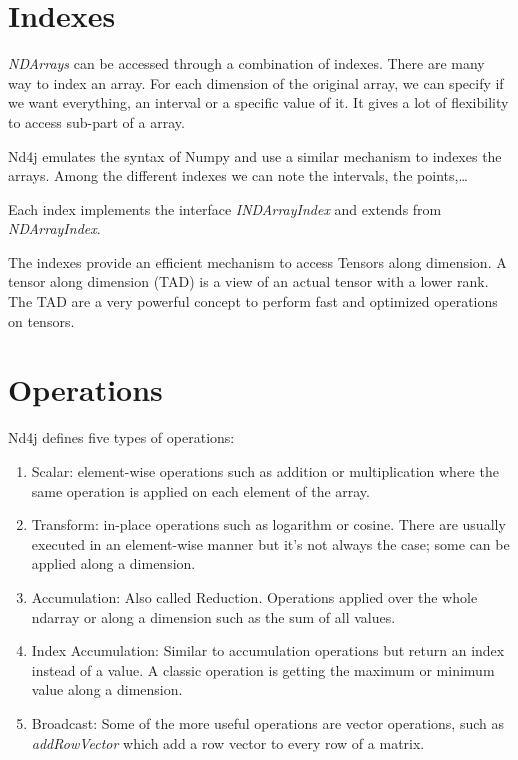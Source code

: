 \section{Indexes}

\textit{NDArrays} can be accessed through a combination of indexes. There are many way to index an array. For each dimension of the original array, we can specify if we want everything, an interval or a specific value of it. It gives a lot of flexibility to access sub-part of a array. 

Nd4j emulates the  syntax of Numpy\cite{numpy} and use a similar mechanism to indexes the arrays. Among the different indexes we can note the intervals, the points,\dots

Each index implements the interface \textit{INDArrayIndex} and extends from \textit{NDArrayIndex}.

The indexes provide an efficient mechanism to access Tensors along dimension. A tensor along dimension (TAD) is a view of an actual tensor with a lower rank. The TAD are a very powerful concept to perform fast and optimized operations on tensors.

\section{Operations}

Nd4j defines five types of operations:
\begin{enumerate}
\item Scalar: element-wise operations such as addition or multiplication where the same operation is applied on each element of the array. 
\item Transform: in-place operations such as logarithm or cosine. There are usually executed in an element-wise manner but it's not always the case; some can be applied along a dimension.
\item Accumulation: Also called Reduction. Operations applied over the whole ndarray or along a dimension such as the sum of all values.
\item Index Accumulation: Similar to accumulation operations but return an index instead of a value. A classic operation is getting the maximum or minimum value along a dimension.
\item Broadcast: Some of the more useful operations are vector operations, such as \textit{addRowVector} which add a row vector to every row of a matrix.
\end{enumerate}

